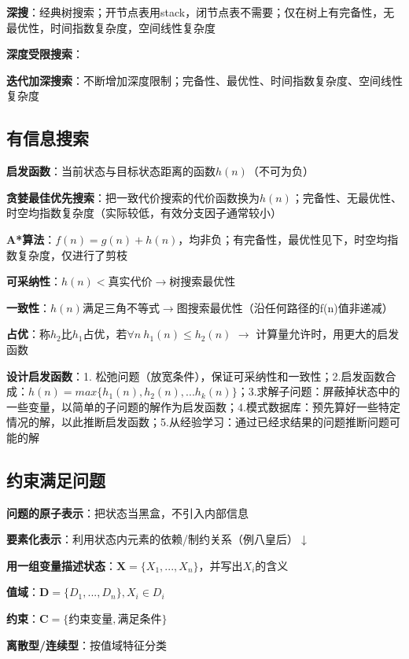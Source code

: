 	\textbf{深搜}：经典树搜索；开节点表用stack，闭节点表不需要；仅在树上有完备性，无最优性，时间指数复杂度，空间线性复杂度
	
	\textbf{深度受限搜索}：
	
	\textbf{迭代加深搜索}：不断增加深度限制；完备性、最优性、时间指数复杂度、空间线性复杂度
	
	\subsection*{有信息搜索}
	
	\textbf{启发函数}：当前状态与目标状态距离的函数$h(n)$（不可为负）
	
	\textbf{贪婪最佳优先搜索}：把一致代价搜索的代价函数换为$h(n)$；完备性、无最优性、时空均指数复杂度（实际较低，有效分支因子通常较小）
	
	\textbf{A*算法}：$f(n)=g(n)+h(n)$，均非负；有完备性，最优性见下，时空均指数复杂度，仅进行了剪枝
	
	\textbf{可采纳性}：$h(n)<$真实代价$\rightarrow$树搜索最优性
	
	\textbf{一致性}：$h(n)$满足三角不等式$\rightarrow$图搜索最优性（沿任何路径的f(n)值非递减）
	
	\textbf{占优}：称$h_2$比$h_1$占优，若$\forall n~h_1(n) \le h_2(n)$ $\rightarrow$ 计算量允许时，用更大的启发函数
	
	\textbf{设计启发函数}：1. 松弛问题（放宽条件），保证可采纳性和一致性；2.启发函数合成：$h(n)=max\{h_1(n), h_2(n), ... h_k(n)\}$；3.求解子问题：屏蔽掉状态中的一些变量，以简单的子问题的解作为启发函数；4.模式数据库：预先算好一些特定情况的解，以此推断启发函数；5.从经验学习：通过已经求结果的问题推断问题可能的解
	
	\subsection*{约束满足问题}
	
	\textbf{问题的原子表示}：把状态当黑盒，不引入内部信息
	
	\textbf{要素化表示}：利用状态内元素的依赖/制约关系（例八皇后）$\downarrow$
	
	\textbf{用一组变量描述状态}：$\mathbf{X}=\{X_1,...,X_n\}$，并写出$X_i$的含义
	
	\textbf{值域}：$\mathbf{D}=\{D_1,...,D_n\}, X_i \in D_i$
	
	\textbf{约束}：$\mathbf{C}=\{\text{约束变量}, \text{满足条件}\}$
	
	\textbf{离散型/连续型}：按值域特征分类
	
